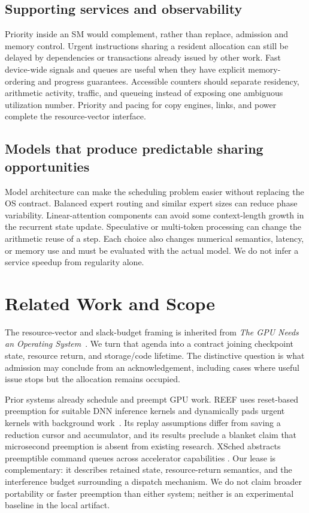 \subsection{Supporting services and observability}
Priority inside an SM would complement, rather than replace, admission and
memory control. Urgent instructions sharing a resident allocation can still
be delayed by dependencies or transactions already issued by other work.
Fast device-wide signals and queues are useful when they have explicit
memory-ordering and progress guarantees. Accessible counters should separate
residency, arithmetic activity, traffic, and queueing instead of exposing one
ambiguous utilization number. Priority and pacing for copy engines, links,
and power complete the resource-vector interface.

\subsection{Models that produce predictable sharing opportunities}
Model architecture can make the scheduling problem easier without replacing
the OS contract. Balanced expert routing and similar expert sizes can reduce
phase variability. Linear-attention components can avoid some context-length
growth in the recurrent state update. Speculative or multi-token processing
can change the arithmetic reuse of a step. Each choice also changes numerical
semantics, latency, or memory use and must be evaluated with the actual model.
We do not infer a service speedup from regularity alone.

\section{Related Work and Scope}
\label{sec:related}
The resource-vector and slack-budget framing is inherited from
\emph{The GPU Needs an Operating System}~\cite{Nourai2026GPUOS}.
We turn that agenda into a contract joining checkpoint state, resource return,
and storage/code lifetime. The distinctive question is what admission may
conclude from an acknowledgement, including cases where useful issue stops
but the allocation remains occupied.

Prior systems already schedule and preempt GPU work. REEF uses reset-based
preemption for suitable DNN inference kernels and dynamically pads urgent
kernels with background work~\cite{Han2022REEF}. Its replay assumptions differ
from saving a reduction cursor and accumulator, and its results preclude a
blanket claim that microsecond preemption is absent from existing research.
XSched abstracts preemptible command queues across accelerator capabilities
\cite{Shen2025XSched}. Our lease is complementary: it describes retained state,
resource-return semantics, and the interference budget surrounding a dispatch
mechanism. We do not claim broader portability or faster preemption than either
system; neither is an experimental baseline in the local artifact.

